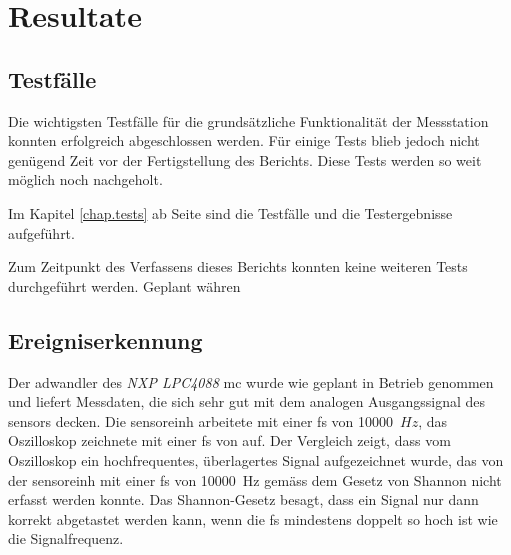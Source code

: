 %
%

\chapter{Resultate}\label{chap.resultate}

\section{Testfälle}
Die wichtigsten Testfälle für die grundsätzliche Funktionalität der Messstation konnten erfolgreich abgeschlossen werden. Für einige Tests blieb jedoch nicht genügend Zeit vor der Fertigstellung des Berichts. Diese Tests werden so weit möglich noch nachgeholt.

Im Kapitel \ref{chap.tests} ab Seite \pageref{chap.tests} sind die Testfälle und die Testergebnisse aufgeführt.


Zum Zeitpunkt des Verfassens dieses Berichts konnten keine weiteren Tests durchgeführt werden. Geplant währen

\section{Ereigniserkennung}
Der \gls{adwandler} des \emph{NXP LPC4088} \gls{mc} wurde wie geplant in Betrieb genommen und liefert Messdaten, die sich sehr gut mit dem analogen Ausgangssignal des \gls{sensor}s decken.   Die \gls{sensoreinh} arbeitete mit einer \gls{fs} von 10000~\ensuremath{Hz}, das Oszilloskop zeichnete mit einer \gls{fs} von  auf. Der Vergleich zeigt, dass vom Oszilloskop ein hochfrequentes, überlagertes Signal aufgezeichnet wurde, das von der \gls{sensoreinh} mit einer \gls{fs} von 10000~Hz gemäss dem Gesetz von Shannon nicht erfasst werden konnte. Das Shannon-Gesetz besagt, dass ein Signal nur dann korrekt abgetastet werden kann, wenn die \gls{fs} mindestens doppelt so hoch ist wie die Signalfrequenz.


